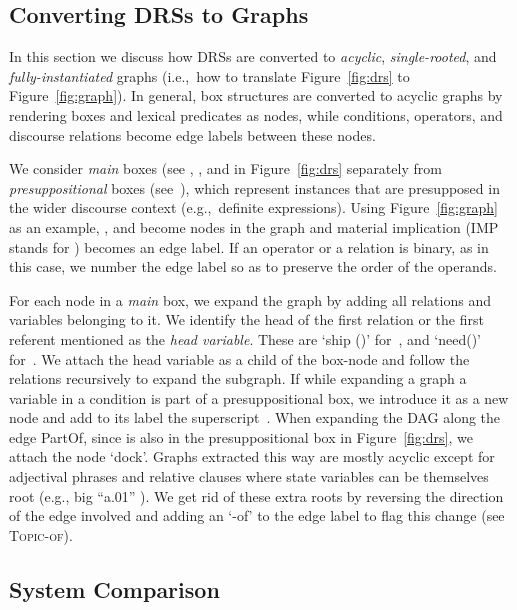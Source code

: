 \documentclass[11pt,a4paper]{article}
\theoremstyle{plain}
\begin{document}
\subsection{Converting DRSs to Graphs}
\label{sec:conv-drss-graphs}

In this section we discuss how DRSs are converted to \textit{acyclic}, \textit{single-rooted}, and \textit{fully-instantiated} graphs (i.e.,~how to translate Figure~\ref{fig:drs} to Figure~\ref{fig:graph}). In general, box structures are converted
to acyclic graphs by rendering boxes and lexical predicates as nodes, 
while conditions, operators, and discourse relations become edge
labels between these nodes.

We consider \textit{main} boxes (see , , and  in
Figure~\ref{fig:drs} separately from \textit{presuppositional} boxes
(see~), which represent instances that are presupposed in the
wider discourse context (e.g.,~definite expressions). Using
Figure~\ref{fig:graph} as an example, ,  and  become nodes in the graph and material implication (IMP stands for
) becomes an edge label. If an operator or a relation is
binary, as in this case, we number the edge label so as to preserve
the order of the operands.

For each node in a \textit{main} box, we expand the graph by adding
all relations and variables belonging to it. We identify the head of
the first relation or the first referent mentioned as the \textit{head variable}. These are `ship ()' for~, and `need()'
for~. We attach the head variable as a child of the box-node and
follow the relations recursively to expand the subgraph. If
while expanding a graph a variable in a condition is part of a
presuppositional box, we introduce it as a new node and add to its
label the superscript~. When expanding the DAG along the edge
{PartOf}, since  is also in the presuppositional box in
Figure~\ref{fig:drs}, we attach the node `dock'.  Graphs
extracted this way are mostly acyclic except for adjectival phrases
and relative clauses where state variables can be themselves root
(e.g., big ``a.01'' ). We get rid of these extra roots by
reversing the direction of the edge involved and adding an `-of' to
the edge label to flag this change (see \textsc{Topic-of}).

\subsection{System Comparison}
\label{sec:systems-experiments}
\end{document}
